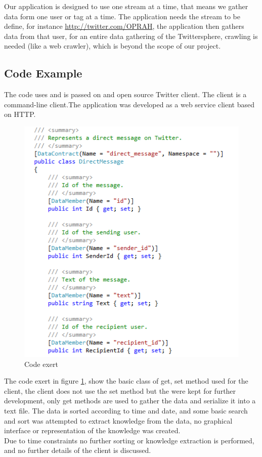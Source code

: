 \documentclass[]{article}  %
\begin{document}
Our application is designed to use one stream at a time, that means we gather data form one user or tag at a time. The application needs the stream to be define, for instance \url{http://twitter.com/OPRAH}, the application then gathers data from that user, for an entire data gathering of the Twittersphere, crawling is needed (like a web crawler), which is beyond the scope of our project.

\subsection{Code Example}

The code uses and is passed on and open source Twitter client. The client is a command-line client.The application was developed as a web service client based on HTTP.

\begin{figure}[h]
\centering
\includegraphics[scale=1]{code1.png}
\caption{Code exert}
\label{figCode1}
\end{figure}

The code exert in figure \ref{figCode1}, show the basic class of get, set method used for the client, the client does not use the set method but the were kept for further development, only get methods are used to gather the data and serialize it into a text file. The data is sorted according to time and date, and some basic search and sort was attempted to extract knowledge from the data, no graphical interface or representation of the knowledge was created.\\ Due to time constraints no further sorting or knowledge extraction is performed, and no further details of the client is discussed.
\end{document}
